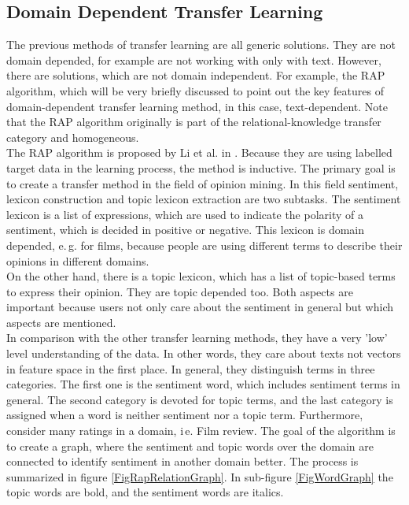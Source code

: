\subsection{Domain Dependent Transfer Learning}\label{TlSubSecDomain}
The previous methods of transfer learning are all generic solutions.
They are not domain depended, for example are not working with only with text.
However, there are solutions, which are not domain independent.
For example, the \ac{RAP} algorithm, which will be very briefly discussed to point out the key features of domain-dependent transfer learning method, in this case, text-dependent.
Note that the \ac{RAP} algorithm originally is part of the relational-knowledge transfer category and homogeneous.\cite[p. 6-8]{Weiss.2016}\\
The \acs{RAP} algorithm is proposed by Li et al. in \cite{Li.2012}.
Because they are using labelled target data in the learning process, the method is inductive.
The primary goal is to create a transfer method in the field of opinion mining.
In this field sentiment, lexicon construction and topic lexicon extraction are two subtasks.
The sentiment lexicon is a list of expressions, which are used to indicate the polarity of a sentiment, which is decided in positive or negative.
This lexicon is domain depended, e.\,g. for films, because people are using different terms to describe their opinions in different domains.\cite{Li.2012}\\
On the other hand, there is a topic lexicon, which has a list of topic-based terms to express their opinion.
They are topic depended too.
Both aspects are important because users not only care about the sentiment in general but which aspects are mentioned.\cite{Li.2012}\\
In comparison with the other transfer learning methods, they have a very 'low' level understanding of the data.
In other words, they care about texts not vectors in feature space in the first place.
In general, they distinguish terms in three categories.
The first one is the sentiment word, which includes sentiment terms in general.
The second category is devoted for topic terms, and the last category is assigned when a word is neither sentiment nor a topic term.
Furthermore, consider many ratings in a domain, i\,e. Film review.
The goal of the algorithm is to create a graph, where the sentiment and topic words over the domain are connected to identify sentiment in another domain better.
The process is summarized in figure \ref{FigRapRelationGraph}.
In sub-figure \ref{FigWordGraph} the topic words are bold, and the sentiment words are italics.
